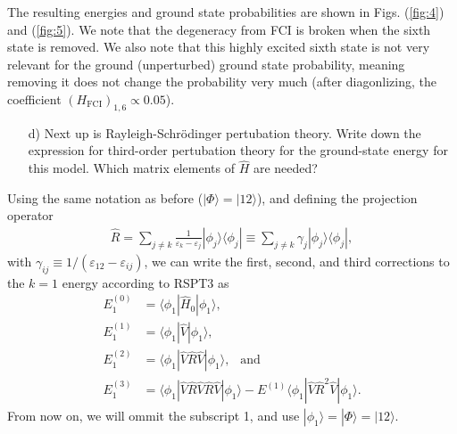 \documentclass[a4paper]{article}
\begin{document}
The resulting energies and ground state probabilities are shown in Figs. (\ref{fig:4}) and (\ref{fig:5}). We note that the degeneracy from FCI is broken when the sixth state is removed. We also note that this highly excited sixth state is not very relevant for the ground (unperturbed) ground state probability, meaning removing it does not change the probability very much (after diagonlizing, the coefficient $(H_\text{FCI})_{1,6}\propto0.05$).


\begin{exframe}
\begin{itemize}
  \item[d)] Next up is Rayleigh-Schrödinger pertubation theory. Write down the expression for third-order pertubation theory for the ground-state energy for this model. Which matrix elements of $\hat H$ are needed?
\end{itemize}
\end{exframe}
Using the same notation as before ($|\Phi\rangle = |12\rangle$), and defining the projection operator 
\begin{align}
\hat R = \sum_{j\not=k} \frac{1}{\varepsilon_k-\varepsilon_j}|\phi_j\rangle \langle \phi_j| \equiv \sum_{j\not=k} \gamma_j |\phi_j\rangle \langle \phi_j|,
\end{align}
with $\gamma_{ij} \equiv 1/(\varepsilon_{12}-\varepsilon_{ij})$, we can write the first, second, and third corrections to the $k=1$ energy according to RSPT3 as
\begin{align}
E^{(0)}_1 &= \langle \phi_1 |\hat H_0 |\phi_1\rangle, \\
%
E^{(1)}_1 &= \langle \phi_1 |\hat V |\phi_1\rangle, \\
%
E^{(2)}_1 &= \langle \phi_1 |\hat V \hat R \hat V |\phi_1\rangle, \ \ \text{ and }\\
%
E^{(3)}_1 &= \langle \phi_1 |\hat V \hat R \hat V \hat R \hat V |\phi_1\rangle - E^{(1)}\langle \phi_1 |\hat V \hat R^2 \hat V |\phi_1\rangle.
\end{align}
From now on, we will ommit the subscript 1, and use $|\phi_1\rangle = |\Phi\rangle = |12\rangle$. 
\end{document}
